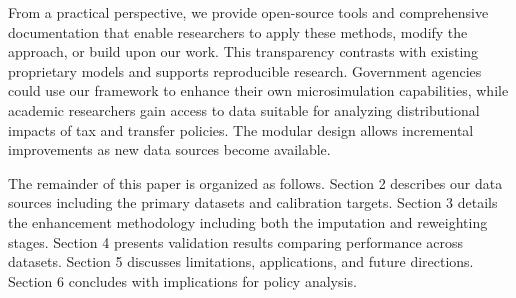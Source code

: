From a practical perspective, we provide open-source tools and comprehensive documentation that enable researchers to apply these methods, modify the approach, or build upon our work. This transparency contrasts with existing proprietary models and supports reproducible research. Government agencies could use our framework to enhance their own microsimulation capabilities, while academic researchers gain access to data suitable for analyzing distributional impacts of tax and transfer policies. The modular design allows incremental improvements as new data sources become available.

The remainder of this paper is organized as follows. Section 2 describes our data sources including the primary datasets and calibration targets. Section 3 details the enhancement methodology including both the imputation and reweighting stages. Section 4 presents validation results comparing performance across datasets. Section 5 discusses limitations, applications, and future directions. Section 6 concludes with implications for policy analysis.